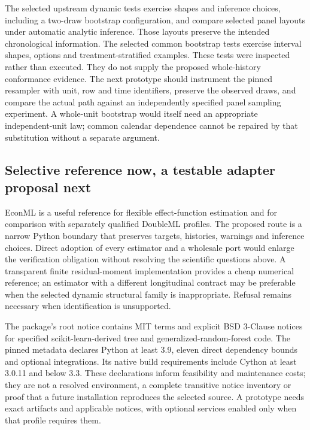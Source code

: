 The selected upstream dynamic tests exercise shapes and inference choices,
including a two-draw bootstrap configuration, and compare selected panel
layouts under automatic analytic inference. Those layouts preserve the
intended chronological information. The selected common bootstrap tests
exercise interval shapes, options and treatment-stratified examples. These
tests were inspected rather than executed. They do not supply the proposed
whole-history conformance evidence. The next prototype should instrument the
pinned resampler with unit, row and time identifiers, preserve the observed
draws, and compare the actual path against an independently specified panel
sampling experiment. A whole-unit bootstrap would itself need an appropriate
independent-unit law; common calendar dependence cannot be repaired by that
substitution without a separate argument.~\citep{exec19_econml_source}

\subsection{Selective reference now, a testable adapter proposal next}
\label{exec19:econml-route}

EconML is a useful reference for flexible effect-function estimation and for
comparison with separately qualified DoubleML profiles. The proposed route
is a narrow Python boundary that preserves targets, histories, warnings and
inference choices. Direct adoption of every estimator and a wholesale port
would enlarge the verification obligation without resolving the scientific
questions above. A transparent finite residual-moment implementation provides
a cheap numerical reference; an estimator with a different longitudinal
contract may be preferable when the selected dynamic structural family is
inappropriate. Refusal remains necessary when identification is unsupported.

The package's root notice contains MIT terms and explicit BSD 3-Clause notices
for specified scikit-learn-derived tree and generalized-random-forest code.
The pinned metadata declares Python at least 3.9, eleven direct dependency
bounds and optional integrations. Its native build requirements include Cython
at least 3.0.11 and below 3.3. These declarations inform feasibility and
maintenance costs; they are not a resolved environment, a complete transitive
notice inventory or proof that a future installation reproduces the selected
source. A prototype needs exact artifacts and applicable notices, with optional
services enabled only when that profile requires them.
\citep{exec19_econml_source}

